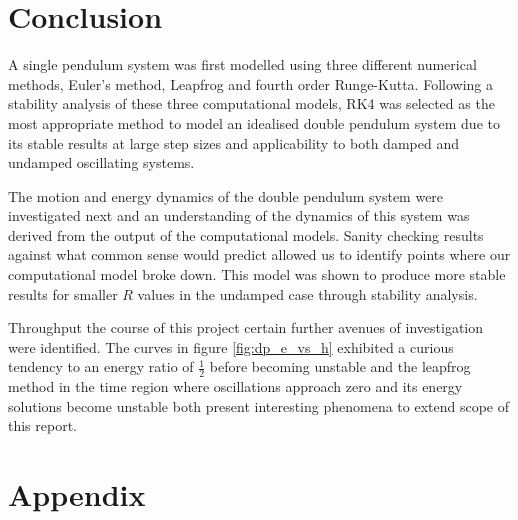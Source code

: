 \documentclass[11pt]{article}
\begin{document}
%
%
%
\section{Conclusion}
A single pendulum system was first modelled using three different numerical methods, Euler's method, Leapfrog and fourth order Runge-Kutta. Following a stability analysis of these three computational models, RK4 was selected as the most appropriate method to model an idealised double pendulum system due to its stable results at large step sizes and applicability to both damped and undamped oscillating systems.

The motion and energy dynamics of the double pendulum system were investigated next and an understanding of the dynamics of this system was derived from the output of the computational models. Sanity checking results against what common sense would predict allowed us to identify points where our computational model broke down. This model was shown to produce more stable results for smaller $R$ values in the undamped case through stability analysis.

Throughput the course of this project certain further avenues of investigation were identified. The curves in figure \ref{fig:dp_e_vs_h} exhibited a curious tendency to an energy ratio of $\frac{1}{2}$ before becoming unstable and the leapfrog method in the time region where oscillations approach zero and its energy solutions become unstable both present interesting phenomena to extend scope of this report.

\newpage
\section{Appendix} \label{app:Appendix}
\end{document}
